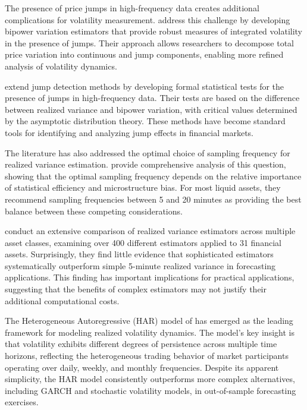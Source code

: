 The presence of price jumps in high-frequency data creates additional complications for volatility measurement. \citet{barndorff2004power} address this challenge by developing bipower variation estimators that provide robust measures of integrated volatility in the presence of jumps. Their approach allows researchers to decompose total price variation into continuous and jump components, enabling more refined analysis of volatility dynamics.

\citet{huang2005using} extend jump detection methods by developing formal statistical tests for the presence of jumps in high-frequency data. Their tests are based on the difference between realized variance and bipower variation, with critical values determined by the asymptotic distribution theory. These methods have become standard tools for identifying and analyzing jump effects in financial markets.

The literature has also addressed the optimal choice of sampling frequency for realized variance estimation. \citet{hansen2005realized} provide comprehensive analysis of this question, showing that the optimal sampling frequency depends on the relative importance of statistical efficiency and microstructure bias. For most liquid assets, they recommend sampling frequencies between 5 and 20 minutes as providing the best balance between these competing considerations.

\citet{liu2015does} conduct an extensive comparison of realized variance estimators across multiple asset classes, examining over 400 different estimators applied to 31 financial assets. Surprisingly, they find little evidence that sophisticated estimators systematically outperform simple 5-minute realized variance in forecasting applications. This finding has important implications for practical applications, suggesting that the benefits of complex estimators may not justify their additional computational costs.

The Heterogeneous Autoregressive (HAR) model of \citet{corsi2009simple} has emerged as the leading framework for modeling realized volatility dynamics. The model's key insight is that volatility exhibits different degrees of persistence across multiple time horizons, reflecting the heterogeneous trading behavior of market participants operating over daily, weekly, and monthly frequencies. Despite its apparent simplicity, the HAR model consistently outperforms more complex alternatives, including GARCH and stochastic volatility models, in out-of-sample forecasting exercises.

